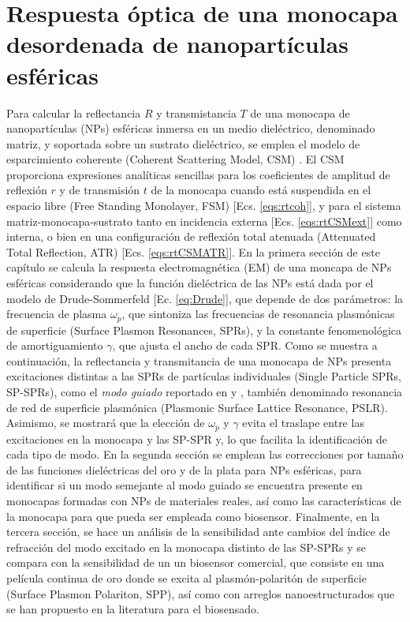 \chapter{Respuesta óptica de una monocapa desordenada de nanopartículas esféricas}
\label{chapter:Resultados}


Para calcular la reflectancia $R$ y transmistancia $T$  de una monocapa de nanopartículas (NPs) esféricas inmersa en un medio dieléctrico, denominado matriz, y soportada sobre un sustrato dieléctrico, se emplea el modelo de esparcimiento coherente (Coherent Scattering Model, CSM) \cite{reyes2018analytical,garcia2012multiple}. El CSM proporciona expresiones analíticas sencillas para los coeficientes de amplitud de reflexión $r$ y de transmisión $t$ de la monocapa cuando está suspendida en el espacio libre (Free Standing Monolayer, FSM) [Ecs. \eqref{eqs:rtcoh}], y para el sistema matriz-monocapa-sustrato tanto en incidencia externa [Ecs. \eqref{eqs:rtCSMext}] como interna, o bien en una configuración de reflexión total atenuada  (Attenuated Total Reflection, ATR) [Ecs. \eqref{eqs:rtCSMATR}]. En la primera sección de este capítulo se calcula la respuesta electromagnética (EM) de una moncapa de NPs esféricas considerando que la función dieléctrica de las NPs está dada por el modelo de Drude-Sommerfeld [Ec. \eqref{eq:Drude}], que depende de dos parámetros: la frecuencia de plasma $\omega_p$, que sintoniza las frecuencias de resonancia plasmónicas de superficie (Surface Plasmon Resonances, SPRs), y la constante fenomenológica de amortiguamiento $\gamma$, que ajusta el ancho de cada SPR. Como se muestra a continuación, la reflectancia y transmitancia de una monocapa de NPs presenta excitaciones distintas a las  SPRs de partículas individuales (Single Particle SPRs, SP-SPRs), como el \emph{modo guiado} reportado en \cite{kabashin2009plasmonic} y \cite{danilov2018ultra}, también denominado resonancia de red de superficie plasmónica (Plasmonic Surface Lattice Resonance, PSLR). Asimismo, se mostrará que la elección de $\omega_p$ y $\gamma$ evita el traslape entre las excitaciones en la monocapa y las SP-SPR y, lo que facilita la identificación de cada tipo de modo. En la segunda sección se emplean las correcciones por tamaño de las funciones dieléctricas del oro y de la plata para NPs esféricas, para identificar si un modo semejante al modo guiado se encuentra presente en monocapas formadas con NPs de materiales reales, así como las  características de la monocapa para que pueda ser empleada como biosensor. Finalmente, en la tercera sección, se hace un análisis de la sensibilidad ante cambios del índice de refracción del modo excitado en la monocapa distinto de las SP-SPRs  y se compara con la sensibilidad de un un biosensor comercial, que consiste en una película continua de oro donde se excita al plasmón-polaritón de superficie (Surface Plasmon Polariton, SPP), así como con arreglos nanoestructurados que se han propuesto en la literatura para el biosensado.

